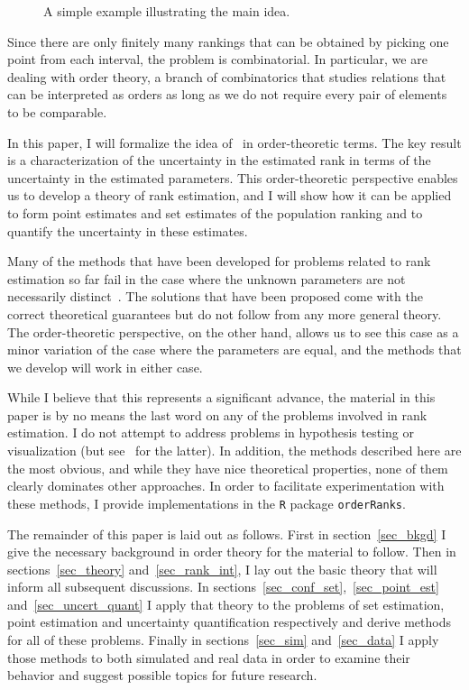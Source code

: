 \documentclass[12pt]{article}
\numberwithin{theorem}{section}
\begin{document}
\begin{figure}[t]
\centering

\caption{A simple example illustrating the main idea.}
\label{fig_example}
\end{figure}

Since there are only finitely many rankings that can be obtained by picking one point from each interval, the problem is combinatorial.  In particular, we are dealing with order theory, a branch of combinatorics that studies relations that can be interpreted as orders as long as we do not require every pair of elements to be comparable.

In this paper, I will formalize the idea of~\cite{klein2020jointCR} in order-theoretic terms.  The key result is a characterization of the uncertainty in the estimated rank in terms of the uncertainty in the estimated parameters.  This order-theoretic perspective enables us to develop a theory of rank estimation, and I will show how it can be applied to form point estimates and set estimates of the population ranking and to quantify the uncertainty in these estimates.

Many of the methods that have been developed for problems related to rank estimation so far fail in the case where the unknown parameters are not necessarily distinct~\citep{hall2009bootstrap, xie2009ties}.  The solutions that have been proposed come with the correct theoretical guarantees but do not follow from any more general theory.  The order-theoretic perspective, on the other hand, allows us to see this case as a minor variation of the case where the parameters are equal, and the methods that we develop will work in either case.

While I believe that this represents a significant advance, the material in this paper is by no means the last word on any of the problems involved in rank estimation.  I do not attempt to address problems in hypothesis testing or visualization (but see~\cite{fattore2014visualizing} for the latter).  In addition, the methods described here are the most obvious, and while they have nice theoretical properties, none of them clearly dominates other approaches.  In order to facilitate experimentation with these methods, I provide implementations in the \texttt{R} package \texttt{orderRanks}.

The remainder of this paper is laid out as follows.  First in section~\ref{sec_bkgd} I give the necessary background in order theory for the material to follow.  Then in sections~\ref{sec_theory} and~\ref{sec_rank_int}, I lay out the basic theory that will inform all subsequent discussions.  In sections~\ref{sec_conf_set},~\ref{sec_point_est} and~\ref{sec_uncert_quant} I apply that theory to the problems of set estimation, point estimation and uncertainty quantification respectively and derive methods for all of these problems.  Finally in sections~\ref{sec_sim} and~\ref{sec_data} I apply those methods to both simulated and real data in order to examine their behavior and suggest possible topics for future research.
\end{document}
